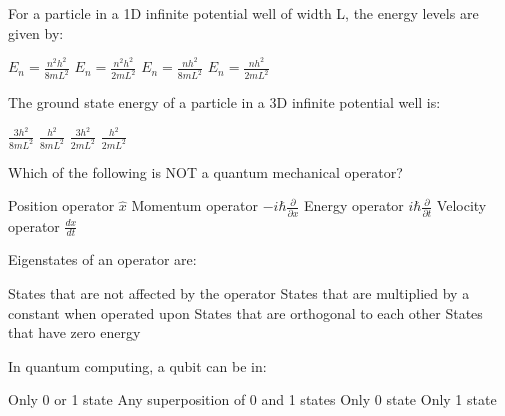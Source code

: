 \begin{question}[2]
For a particle in a 1D infinite potential well of width L, the energy levels are given by:

\begin{oneparcheckboxes}
\correctchoice $\displaystyle E_n = \frac{n^2h^2}{8mL^2}$
\choice $\displaystyle E_n = \frac{n^2h^2}{2mL^2}$
\choice $\displaystyle E_n = \frac{nh^2}{8mL^2}$
\choice $\displaystyle E_n = \frac{nh^2}{2mL^2}$
\end{oneparcheckboxes}
\end{question}

\begin{question}[2]
The ground state energy of a particle in a 3D infinite potential well is:

\begin{oneparcheckboxes}
\correctchoice $\displaystyle \frac{3h^2}{8mL^2}$
\choice $\displaystyle \frac{h^2}{8mL^2}$
\choice $\displaystyle \frac{3h^2}{2mL^2}$
\choice $\displaystyle \frac{h^2}{2mL^2}$
\end{oneparcheckboxes}
\end{question}

\begin{question}[2]
Which of the following is NOT a quantum mechanical operator?

\begin{oneparcheckboxes}
\choice Position operator $\displaystyle \hat{x}$
\choice Momentum operator $\displaystyle -i\hbar\frac{\partial}{\partial x}$
\choice Energy operator $\displaystyle i\hbar\frac{\partial}{\partial t}$
\correctchoice Velocity operator $\displaystyle \frac{dx}{dt}$
\end{oneparcheckboxes}
\end{question}

\begin{question}[2]
Eigenstates of an operator are:

\begin{oneparcheckboxes}
\choice States that are not affected by the operator
\correctchoice States that are multiplied by a constant when operated upon
\choice States that are orthogonal to each other
\choice States that have zero energy
\end{oneparcheckboxes}
\end{question}

\begin{question}[2]
In quantum computing, a qubit can be in:

\begin{oneparcheckboxes}
\choice Only 0 or 1 state
\correctchoice Any superposition of 0 and 1 states
\choice Only 0 state
\choice Only 1 state
\end{oneparcheckboxes}
\end{question}

